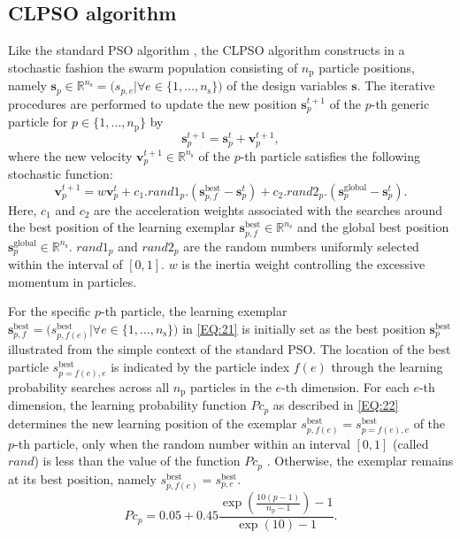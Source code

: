 \documentclass[preprint,3p]{elsarticle}
\begin{document}
\begin{linenumbers}
\subsection{CLPSO algorithm}\label{SUBSEC:25}
Like the standard PSO algorithm \cite{Eberhart1995}, the CLPSO algorithm \cite{Liang2006, VAN2023} constructs in a stochastic fashion the swarm population consisting of $n_\text{p}$ particle positions, namely
$\textbf{s}_p\in\mathbb{R}^{n_\text{s}}=\bigl(s_{p,e}|\forall e \in
\{1,\dots,n_\text{s}\}\bigr)$ of the design variables $\textbf{s}$. The iterative procedures are performed to
update the new position $\textbf{s}_p^{t+1}$ of the $p$-th generic particle for $p\in\{1,\dots,n_\text{p}\}$ by
\begin{equation}
	\textbf{s}_p^{t+1} =
	\textbf{s}_p^{t}+\textbf{v}_p^{t+1},
	\label{EQ:20}
\end{equation}
where the new velocity $\textbf{v}_p^{t+1}\in\mathbb{R}^{n_\text{s}}$ of the $p$-th
particle satisfies the following stochastic function:
\begin{equation}
	\textbf{v}_p^{t+1} = w\textbf{v}_p^{t}+c_1.rand1_p. (\textbf{s}_{p,f}^\text{best}-\textbf{s}_p^{t})+c_2.rand2_p.
	(\textbf{s}_p^\text{global}-\textbf{s}_p^{t}).
	\label{EQ:21}
\end{equation}
Here, $c_1$ and $c_2$ are the acceleration weights associated with the searches around the best position of the learning exemplar $\textbf{s}_{p,f}^\text{best}\in\mathbb{R}^{n_\text{s}}$ and the global best position $\textbf{s}_p^\text{global}\in\mathbb{R}^{n_\text{s}}$.
$rand1_p$ and $rand2_p$ are the random numbers uniformly selected within the interval of $[0,1]$.
$w$ is the inertia weight controlling the excessive momentum in particles. 

For the specific $p$-th particle, the learning exemplar $\textbf{s}_{p,f}^\text{best} = \bigl(s_{p,f(e)}^\text{best}|\forall e \in \{1,\dots, n_\text{s}\}\bigr)$ in \cref{EQ:21} is initially set as the best position $\textbf{s}_p^\text{best}$ illustrated from the simple context of the standard PSO. The location of the best particle $s_{p=f(e),e}^\text{best}$ is indicated by the particle index $f(e)$ through the learning probability searches across all $n_\text{p}$ particles in the $e$-th dimension. For each $e$-th dimension, the learning probability function $Pc_p$ as described in \cref{EQ:22} determines the new learning position of the exemplar $s_{p,f(e)}^\text{best}=s_{p=f(e),e}^\text{best}$ of the $p$-th particle, only when the random number within an interval $[0,1]$ (called $rand$) is less than the value of the function $Pc_p$ \cite{Liang2006}. Otherwise, the exemplar remains at its best position, namely $s_{p,f(e)}^\text{best}=s_{p,e}^\text{best}$.
\begin{equation}
	Pc_p = 0.05+0.45\frac{\exp\left(\frac{\displaystyle 10(p-1)}{\displaystyle
			n_\text{p}-1}\right)-1}{\exp(10)-1}.
	\label{EQ:22}
\end{equation}


\end{linenumbers}
\end{document}
